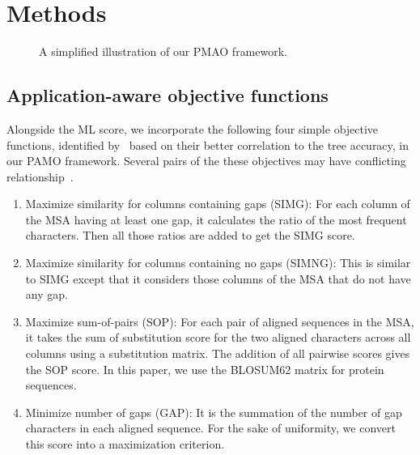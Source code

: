 \section{Methods}
\label{sec:method}

\begin{figure*}[!htbp]%
	\begin{adjustwidth}{-1.1cm}{}
		\centering
	\end{adjustwidth}
	\caption{A simplified illustration of our PMAO framework.}
	\label{fig:PMAO}
\end{figure*}

\subsection{Application-aware objective functions}
Alongside the ML score, we incorporate the following four simple objective functions, identified by~\cite{nayeem2020multiobjective} based on their better correlation to the tree accuracy, in our PAMO framework. Several pairs of the these objectives may have conflicting relationship~\cite{nayeem2020multiobjective}.  
\begin{enumerate}
	\item Maximize similarity for columns containing gaps (SIMG): For each column of the MSA having at least one gap, it calculates the ratio of the most frequent characters. Then all those ratios are added to get the SIMG score.
	\item Maximize similarity for columns containing no gaps (SIMNG): This is similar to SIMG except that it considers those columns of the MSA that do not have any gap.
	\item Maximize sum-of-pairs (SOP): For each pair of aligned sequences in the MSA, it takes the sum of substitution score for the two aligned characters across all columns using a substitution matrix. The addition of all pairwise scores gives the SOP score. In this paper, we use the BLOSUM62 matrix for protein sequences.
	\item Minimize number of gaps (GAP): It is the summation of the number of gap characters in each aligned sequence. For the sake of uniformity, we convert this score into a maximization criterion.
\end{enumerate}


